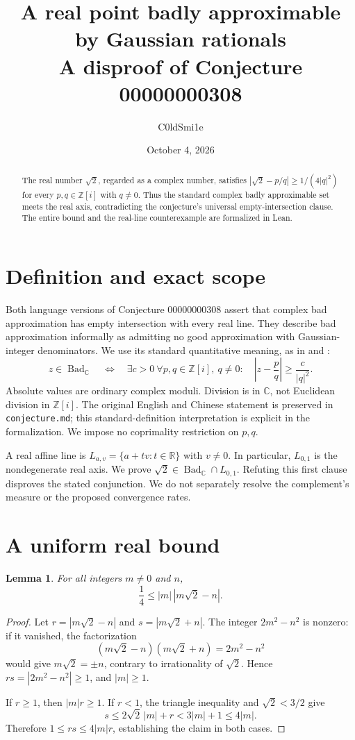 \documentclass[11pt]{article}
\title{A real point badly approximable by Gaussian rationals\\A disproof of Conjecture 00000000308}
\author{C0ldSmi1e}
\date{October 4, 2026}
\newtheorem{lemma}{Lemma}
\newcommand{\R}{\mathbb R}
\newcommand{\C}{\mathbb C}
\newcommand{\Z}{\mathbb Z}
\newcommand{\Bad}{\operatorname{Bad}_{\C}}
\begin{document}
\maketitle
\begin{abstract}
The real number $\sqrt2$, regarded as a complex number, satisfies
$|\sqrt2-p/q|\ge 1/(4|q|^2)$ for every $p,q\in\Z[i]$ with $q\ne0$.
Thus the standard complex badly approximable set meets the real axis, contradicting the conjecture's universal empty-intersection clause. The entire bound and the real-line counterexample are formalized in Lean.
\end{abstract}

\section{Definition and exact scope}
Both language versions of Conjecture 00000000308 assert that complex bad approximation has empty intersection with every real line. They describe bad approximation informally as admitting no good approximation with Gaussian-integer denominators. We use its standard quantitative meaning, as in \cite[Eq.~(2)]{EK} and \cite[p.~1]{Hines}:
\[
 z\in\Bad\quad\Longleftrightarrow\quad
 \exists c>0\ \forall p,q\in\Z[i],\ q\ne0:
 \quad \left|z-\frac pq\right|\ge\frac{c}{|q|^2}.
\]
Absolute values are ordinary complex moduli. Division is in $\C$, not Euclidean division in $\Z[i]$. The original English and Chinese statement is preserved in \texttt{conjecture.md}; this standard-definition interpretation is explicit in the formalization. We impose no coprimality restriction on $p,q$.

A real affine line is $L_{a,v}=\{a+tv:t\in\R\}$ with $v\ne0$. In particular, $L_{0,1}$ is the nondegenerate real axis. We prove $\sqrt2\in\Bad\cap L_{0,1}$. Refuting this first clause disproves the stated conjunction. We do not separately resolve the complement's measure or the proposed convergence rates.

\section{A uniform real bound}
\begin{lemma}
For all integers $m\ne0$ and $n$,
\[
 \frac14\le |m|\,|m\sqrt2-n|.
\]
\end{lemma}
\begin{proof}
Let $r=|m\sqrt2-n|$ and $s=|m\sqrt2+n|$. The integer $2m^2-n^2$ is nonzero: if it vanished, the factorization
\[
 (m\sqrt2-n)(m\sqrt2+n)=2m^2-n^2
\]
would give $m\sqrt2=\pm n$, contrary to irrationality of $\sqrt2$. Hence $rs=|2m^2-n^2|\ge1$, and $|m|\ge1$.

If $r\ge1$, then $|m|r\ge1$. If $r<1$, the triangle inequality and $\sqrt2<3/2$ give
\[
 s\le2\sqrt2\,|m|+r<3|m|+1\le4|m|.
\]
Therefore $1\le rs\le4|m|r$, establishing the claim in both cases.
\end{proof}
\newpage
\end{document}

